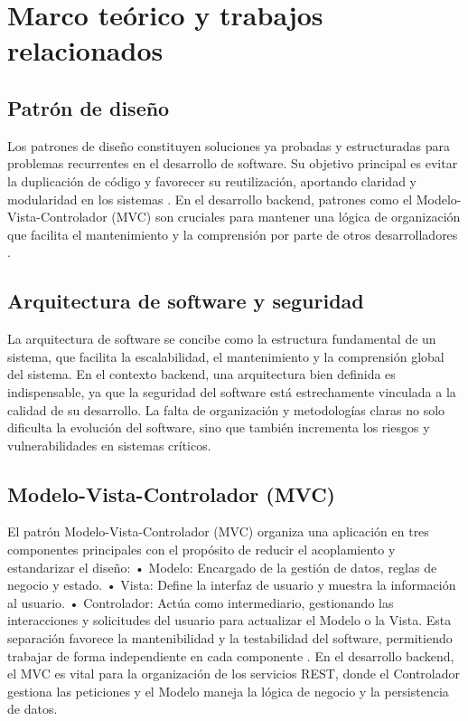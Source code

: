 \section{Marco teórico y trabajos relacionados}
\subsection{Patrón de diseño}
Los patrones de diseño constituyen soluciones ya probadas y estructuradas para problemas recurrentes en el desarrollo de software. Su objetivo principal es evitar la duplicación de código y favorecer su reutilización, aportando claridad y modularidad en los sistemas \cite{gavilanez2022analisis}. En el desarrollo backend, patrones como el Modelo-Vista-Controlador (MVC) son cruciales para mantener una lógica de organización que facilita el mantenimiento y la comprensión por parte de otros desarrolladores \cite{zambrano_patron}.

\subsection{Arquitectura de software y seguridad}
La arquitectura de software se concibe como la estructura fundamental de un sistema, que facilita la escalabilidad, el mantenimiento y la comprensión global del sistema. En el contexto backend, una arquitectura bien definida es indispensable, ya que la seguridad del software está estrechamente vinculada a la calidad de su desarrollo. La falta de organización y metodologías claras no solo dificulta la evolución del software, sino que también incrementa los riesgos y vulnerabilidades en sistemas críticos.

\subsection{Modelo-Vista-Controlador (MVC)}
El patrón Modelo-Vista-Controlador (MVC) organiza una aplicación en tres componentes principales con el propósito de reducir el acoplamiento y estandarizar el diseño:
•	Modelo: Encargado de la gestión de datos, reglas de negocio y estado.
•	Vista: Define la interfaz de usuario y muestra la información al usuario.
•	Controlador: Actúa como intermediario, gestionando las interacciones y solicitudes del usuario para actualizar el Modelo o la Vista.
Esta separación favorece la mantenibilidad y la testabilidad del software, permitiendo trabajar de forma independiente en cada componente \cite{hernandez2015guia}. En el desarrollo backend, el MVC es vital para la organización de los servicios REST, donde el Controlador gestiona las peticiones y el Modelo maneja la lógica de negocio y la persistencia de datos.


